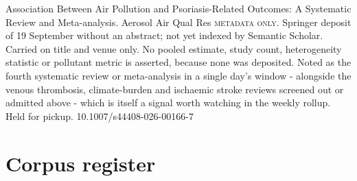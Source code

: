 \documentclass[10pt]{article}
\begin{document}
{Association Between Air Pollution and Psoriasis-Related Outcomes: A Systematic Review and Meta-analysis.}
{Aerosol Air Qual Res}
{\textsc{metadata only.} Springer deposit of 19 September without an abstract; not yet indexed by Semantic Scholar. Carried on title and venue only. No pooled estimate, study count, heterogeneity statistic or pollutant metric is asserted, because none was deposited. Noted as the fourth systematic review or meta-analysis in a single day's window - alongside the venous thrombosis, climate-burden and ischaemic stroke reviews screened out or admitted above - which is itself a signal worth watching in the weekly rollup. Held for pickup.}
{10.1007/s44408-026-00166-7}


\section*{\sffamily\bfseries\color{Deep}Corpus register}
\vspace{-1.5mm}{\color{Amber}\rule{\linewidth}{1.1pt}}\vspace{2.5mm}


\end{document}
